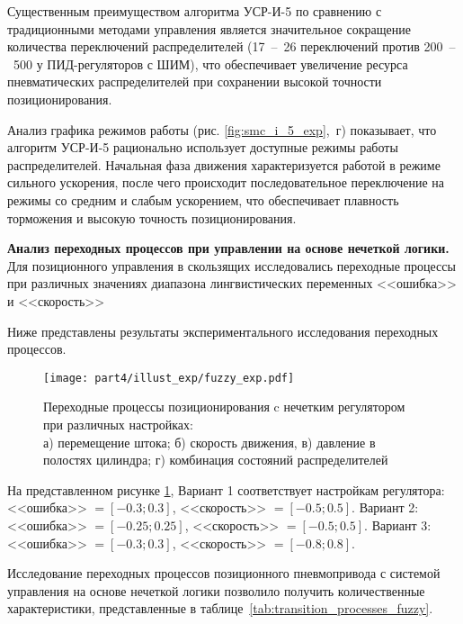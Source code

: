 Существенным преимуществом алгоритма УСР-И-5 по сравнению с традиционными методами управления является значительное сокращение
количества переключений распределителей (17~--~26 переключений против 200~--~500 у ПИД-регуляторов с ШИМ), что обеспечивает
увеличение ресурса пневматических распределителей при сохранении высокой точности позиционирования.

Анализ графика режимов работы (рис. \ref{fig:smc_i_5_exp},~г) показывает, что алгоритм УСР-И-5 рационально использует
доступные режимы работы распределителей. Начальная фаза движения характеризуется работой в режиме сильного ускорения,
после чего происходит последовательное переключение на режимы со средним и
слабым ускорением, что обеспечивает плавность торможения и высокую точность позиционирования.

\textbf{Анализ переходных процессов при управлении на основе нечеткой логики.}
Для позиционного управления в скользящих исследовались переходные процессы при различных значениях
диапазона лингвистических переменных <<ошибка>> и <<скорость>>

Ниже представлены результаты экспериментального исследования переходных процессов.

\begin{figure}
	\centering
	\texttt{[image: part4/illust\_exp/fuzzy\_exp.pdf]}
	\caption{Переходные процессы позиционирования c нечетким регулятором при различных настройках:\\
		а) перемещение штока; б) скорость движения, в) давление в полостях цилиндра; г) комбинация состояний распределителей}
	\label{fig:fuzzy_exp}
\end{figure}

На представленном рисунке \ref{fig:fuzzy_exp}, Вариант 1 соответствует настройкам регулятора: <<ошибка>> $=[-\num{0.3};\num{0.3}]$, <<скорость>> $=[\num{-0.5};\num{0.5}]$.
Вариант 2: <<ошибка>> $=[-\num{0.25};\num{0.25}]$, <<скорость>> $=[\num{-0.5};\num{0.5}]$. Вариант 3: <<ошибка>> $=[-\num{0.3};\num{0.3}]$, <<скорость>> $=[\num{-0.8};\num{0.8}]$.

Исследование переходных процессов позиционного пневмопривода с системой управления на основе нечеткой
логики позволило получить количественные характеристики, представленные в таблице~\ref{tab:transition_processes_fuzzy}.

